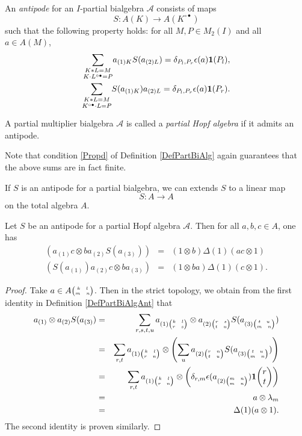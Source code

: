 \begin{Def}\label{DefPartBiAlgAnt} An \emph{antipode} for an $I$-partial bialgebra $\mathscr{A}$ consists of maps \[S:A(K)\rightarrow A(K^{\circ\bullet})\]
such that the following property holds: for all $M,P\in M_2(I)$ and all $a\in A(M)$, \begin{eqnarray*} \underset{K\cdot L^{\circ\bullet}=P}{\sum_{K* L = M}} a_{(1)K}S(a_{(2)L})= \delta_{P_l,P_r}\epsilon(a)\mathbf{1}(P_l),\\\underset{K^{\circ\bullet}\cdot L=P}{\sum_{K* L = M}} S(a_{(1)K})a_{(2)L}= \delta_{P_l,P_r}\epsilon(a)\mathbf{1}(P_r).\end{eqnarray*}

A partial multiplier bialgebra $\mathscr{A}$ is called a \emph{partial Hopf algebra} if it admits an antipode.
\end{Def} 

\begin{Rem} Note that condition \ref{Propd} of Definition \ref{DefPartBiAlg} again guarantees that the above sums are in fact finite.
\end{Rem}

If $S$ is an antipode for a partial bialgebra, we can extends $S$ to a linear map \[S:A\rightarrow A\] on the total algebra $A$. 

\begin{Lem}\label{LemAnti} Let $S$ be an antipode for a partial Hopf algebra $\mathscr{A}$. Then for all $a,b,c\in A$, one has \begin{eqnarray*} (a_{(1)}c\otimes ba_{(2)}S(a_{(3)})) &=& (1\otimes b)\Delta(1)(ac\otimes 1)\\ (S(a_{(1)})a_{(2)}c\otimes ba_{(3)})&=& (1\otimes ba)\Delta(1)(c\otimes 1).\end{eqnarray*}
\end{Lem} 


\begin{proof} Take $a \in A{{\tiny \begin{pmatrix} k \quad l \\ m \quad n\end{pmatrix}}}$. Then in the strict topology, we obtain from the first identity in Definition \ref{DefPartBiAlgAnt} that 
\begin{eqnarray*}
a_{(1)}\otimes a_{(2)}S(a_{(3)}) 
&=& 
\sum_{r,s,t,u} a_{(1){\tiny \begin{pmatrix} k \quad l \\ r \quad s\end{pmatrix}}} \otimes a_{(2){\tiny \begin{pmatrix} r \quad s \\ t \quad u\end{pmatrix}}}S(a_{(3){\tiny \begin{pmatrix} t \quad u \\ m \quad n\end{pmatrix}}})\\ 
&=& 
\sum_{r,t} a_{(1){\tiny \begin{pmatrix} k \quad l \\ r \quad n\end{pmatrix}}} \otimes \left(\sum_{u} a_{(2){\tiny \begin{pmatrix} r \quad n \\ t \quad u\end{pmatrix}}}S(a_{(3){\tiny \begin{pmatrix} t \quad u \\ m \quad n\end{pmatrix}}})\right)\\ 
&=& 
\sum_{r,t} a_{(1){\tiny \begin{pmatrix} k \quad l \\ r \quad n\end{pmatrix}}} \otimes \left(\delta_{r,m}\epsilon(a_{(2){\tiny \begin{pmatrix} m \quad n \\ m \quad n\end{pmatrix}}})\mathbf{1}\!\begin{pmatrix} r \\ t\end{pmatrix}\right)\\
&=&
a\otimes \lambda_m\\
&=&
\Delta(1)(a\otimes 1).
\end{eqnarray*}
The second identity is proven similarly.
\end{proof} 

